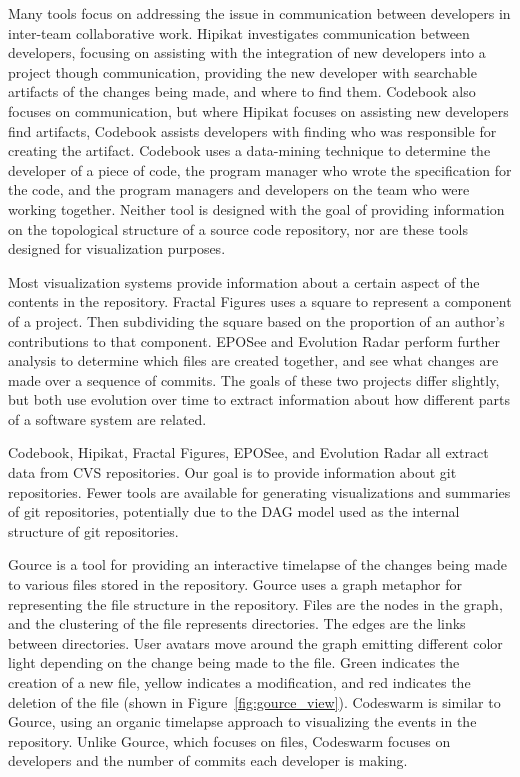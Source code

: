 Many tools focus on addressing the issue in communication between
developers in inter-team collaborative work. Hipikat\cite{Cubranic2005}
investigates communication between developers, focusing on assisting
with the integration of new developers into a project though
communication, providing the new developer with searchable artifacts of
the changes being made, and where to find them. Codebook\cite{Begel2010}
also focuses on communication, but where Hipikat focuses on assisting
new developers find artifacts, Codebook assists developers with finding
who was responsible for creating the artifact. Codebook uses a
data-mining technique to determine the developer of a piece of code, the
program manager who wrote the specification for the code, and the
program managers and developers on the team who were working together.
Neither tool is designed with the goal of providing information on the
topological structure of a source code repository, nor are these tools
designed for visualization purposes.

Most visualization systems provide information about a certain aspect of
the contents in the repository. Fractal Figures\cite{Ambros2005} uses a
square to represent a component of a project. Then subdividing the
square based on the proportion of an author's contributions to that
component. EPOSee\cite{Burch2005} and Evolution Radar\cite{Ambros2009}
perform further analysis to determine which files are created together,
and see what changes are made over a sequence of commits. The goals of
these two projects differ slightly, but both use evolution over time to
extract information about how different parts of a software system are
related.

Codebook, Hipikat, Fractal Figures, EPOSee, and Evolution Radar all
extract data from CVS repositories. Our goal is to provide information
about git repositories. Fewer tools are available for generating
visualizations and summaries of git repositories, potentially due to the
DAG model used as the internal structure of git repositories.

Gource\cite{Caudwell2010} is a tool for providing an interactive
timelapse of the changes being made to various files stored in the
repository. Gource uses a graph metaphor for representing the file
structure in the repository. Files are the nodes in the graph, and the
clustering of the file represents directories. The edges are the links
between directories. User avatars move around the graph emitting
different color light depending on the change being made to the file.
Green indicates the creation of a new file, yellow indicates a
modification, and red indicates the deletion of the file (shown in
Figure~\ref{fig:gource_view}). Codeswarm\cite{ogawa09} is similar to
Gource, using an organic timelapse approach to visualizing the events in
the repository. Unlike Gource, which focuses on files, Codeswarm focuses
on developers and the number of commits each developer is making.

